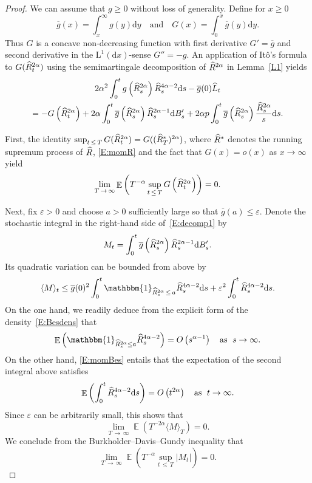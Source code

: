 \documentclass[AHL,Unicode,longabstracts,published]{cedram}
\renewcommand{\bar}[1]{\overline{#1}}
\renewcommand{\hat}[1]{\widehat{#1}}
\newcommand{\dd}{\mathrm{d}}
\newcommand{\rmL}{\mathrm{L}}
\DeclareMathOperator{\E}{\mathbb{E}}
\newcommand{\bbmun}{\mathbbm{1}}
\let\oldhat\hat
\renewcommand*{\hat}[1]{\mathchoice{\widehat{#1}}{\widehat{#1}}{\oldhat{#1}}{\oldhat{#1}}}
\begin{document}
\begin{proof}
We can assume that $g\geq 0$ without loss of generality. Define for $x\geq 0$
\[
\bar g(x)=\int_x^{\infty} g(y)\dd y\quad \text{and} \quad G(x) = \int_0^x \bar g(y) \dd y.
\]
Thus $G$ is a concave non-decreasing function with first derivative $G'=\bar g$ and second derivative in the $\rmL^1(\dd x)$-sense $G'' =-g$. An application of Itô's formula to $G(\hat R_t^{2\alpha})$ using the semimartingale decomposition of $\hat R^{2\alpha}$ in Lemma~\ref{L1} yields
\begin{multline}\label{E:decomp1}
 2\alpha^2 \int_0^t g\left(\hat R^{2\alpha}_s\right)\hat R_s^{4\alpha-2} \dd s
- \bar g(0) \hat{L}_t \\
=  - G\left(\hat R_t^{2\alpha}\right) + 2\alpha \int_0^t \bar g\left(\hat R^{2\alpha}_s\right) \hat R_s^{2\alpha-1} \dd B'_s + 2\alpha p \int_0^t \bar g\left(\hat R^{2\alpha}_s\right) \frac{\hat R^{2\alpha}_s}{s} \dd s.
\end{multline}

First, the identity $\sup_{t\,\leq\,T} G(\hat R_t^{2\alpha})= G((\hat R^*_T)^{2\alpha})$, where $ \hat R^*$ denotes the running supremum process of $\hat R$, \eqref{E:momR} and the fact that $G(x)=o(x)$ as $x\to \infty$ yield
\[
\lim_{T\,\to\,\infty} \E\left(T^{-\alpha} \sup_{t\,\leq\,T} G\left(\hat R_t^{2\alpha}\right)\right)=0.
\]

Next, fix $\varepsilon>0$ and choose $a>0$ sufficiently large so that $\bar g(a)\leq \varepsilon$. Denote the stochastic integral in the right-hand side of~\eqref{E:decomp1} by
\[
M_t= \int_0^t \bar g\left(\hat R^{2\alpha}_s\right) \hat R_s^{2\alpha-1} \dd B'_s.
\]
Its quadratic variation can be bounded from above by
\[
\langle M \rangle_t\leq \bar g(0)^2\int_0^t \bbmun_{\hat R^{2\alpha}_s\,\leq\,a} \hat R_s^{4\alpha-2} \dd s
+ \varepsilon^2 \int_0^t \hat R_s^{4\alpha-2} \dd s.
\]
On the one hand, we readily deduce from the explicit form of the density~\eqref{E:Besdens} that
\[
\E\left(\bbmun_{\hat R^{2\alpha}_s\leq a} \hat R_s^{4\alpha-2}\right)= O\left(s^{\alpha-1}\right) \quad \text{as }\;s\to \infty.
\]
On the other hand, \eqref{E:momBes} entails that the expectation of the second integral above satisfies
\[
\E\left(\int_0^t \hat R_s^{4\alpha-2} \dd s\right) = O\left(t^{2\alpha}\right)\quad \text{as }\;t\to \infty.
\]
Since $\varepsilon$ can be arbitrarily small, this shows that
\[
\lim_{T\,\to\,\infty} \E(T^{-2\alpha} \langle M \rangle_T)=0.
\]
We conclude from the Burkholder--Davis--Gundy inequality that
\[
\lim_{T\,\to\,\infty} \E\left(T^{-\alpha} \sup_{t\,\leq\,T} |M_t|\right)=0.
\]




\end{proof}
\end{document}
